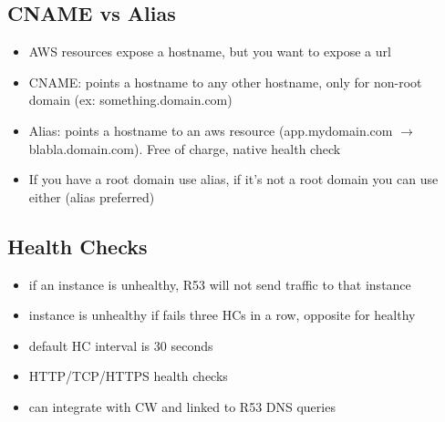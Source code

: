\documentclass[]{scrartcl}
\begin{document}
\subsection{CNAME vs Alias}
\begin{itemize}
	\item AWS resources expose a hostname, but you want to expose a url
	\item CNAME: points a hostname to any other hostname, only for non-root domain (ex: something.domain.com)
	\item Alias: points a hostname to an aws resource (app.mydomain.com $\rightarrow$ blabla.domain.com). Free of charge, native health check
	\item If you have a root domain use alias, if it's not a root domain you can use either (alias preferred)
\end{itemize}

\subsection{Health Checks}
\begin{itemize}
	\item if an instance is unhealthy, R53 will not send traffic to that instance
	\item instance is unhealthy if fails three HCs in a row, opposite for healthy
	\item default HC interval is 30 seconds
	\item HTTP/TCP/HTTPS health checks
	\item can integrate with CW and linked to R53 DNS queries
\end{itemize}
\end{document}
